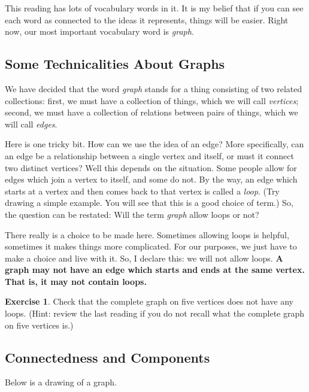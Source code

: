 \documentclass[12pt,letterpaper]{article}
\theoremstyle{definition}
\newtheorem{exercise}[question]{Exercise}
\begin{document}
This reading has lots of vocabulary words in it. It is my belief that if you can see each word as connected
to the ideas it represents, things will be easier. 
Right now, our most important vocabulary word is \emph{graph}.

\subsection*{Some Technicalities About Graphs}

We have decided that the word \emph{graph} stands for a thing consisting of two related collections:
first, we must have a collection of things, which we will call \emph{vertices}; second, we must have a
collection of relations between pairs of things, which we will call \emph{edges}.

Here is one tricky bit. How can we use the idea of an edge? More specifically, can an edge be a relationship
between a single vertex and itself, or must it connect two distinct vertices? Well this depends on the
situation. Some people allow for edges which join a vertex to itself, and some do not. By the way, an edge
which starts at a vertex and then comes back to that vertex is called a \emph{loop}. 
(Try drawing a simple example. You will see that this is a good choice of term.) So, the question can be restated:
Will the term \emph{graph} allow loops or not?

There really is a choice to be made here. Sometimes allowing loops is helpful, sometimes it makes things more 
complicated. For our purposes, we just have to make a choice and live with it. So, I declare this: we will
not allow loops. \textbf{A graph may not have an edge which starts and ends at the same vertex. 
That is, it may not contain loops.}

\begin{exercise}
Check that the complete graph on five vertices does not have any loops. (Hint: review the last reading
if you do not recall what the complete graph on five vertices is.)
\end{exercise}


\subsection*{Connectedness and Components}

Below is a drawing of a graph.
\end{document}

